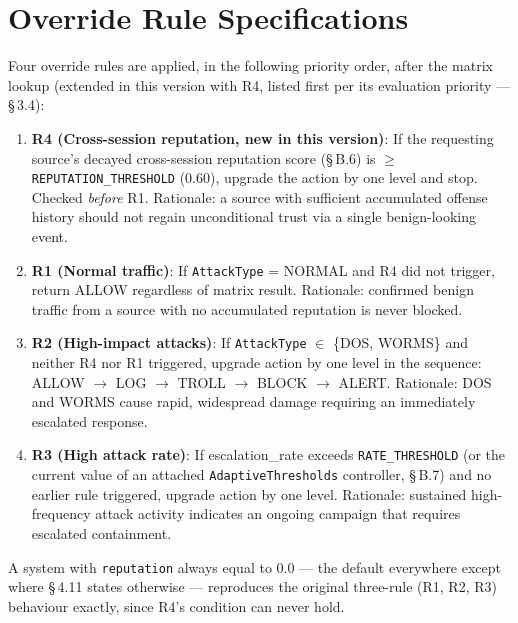 \section{Override Rule Specifications}

Four override rules are applied, in the following priority order, after the
matrix lookup (extended in this version with R4, listed first per its
evaluation priority --- \S\,3.4):

\begin{enumerate}
  \item \textbf{R4 (Cross-session reputation, new in this version)}: If the
        requesting source's decayed cross-session reputation score
        (\S\,B.6) is $\geq$ \texttt{REPUTATION\_THRESHOLD} (0.60), upgrade
        the action by one level and stop. Checked \emph{before} R1.
        Rationale: a source with sufficient accumulated offense history
        should not regain unconditional trust via a single benign-looking
        event.

  \item \textbf{R1 (Normal traffic)}: If \texttt{AttackType} = NORMAL and R4
        did not trigger, return ALLOW regardless of matrix result.
        Rationale: confirmed benign traffic from a source with no
        accumulated reputation is never blocked.

  \item \textbf{R2 (High-impact attacks)}: If \texttt{AttackType} $\in$
        \{DOS, WORMS\} and neither R4 nor R1 triggered, upgrade action by one
        level in the sequence:
        ALLOW $\to$ LOG $\to$ TROLL $\to$ BLOCK $\to$ ALERT.
        Rationale: DOS and WORMS cause rapid, widespread damage requiring
        an immediately escalated response.

  \item \textbf{R3 (High attack rate)}: If escalation\_rate exceeds
        \texttt{RATE\_THRESHOLD} (or the current value of an attached
        \texttt{AdaptiveThresholds} controller, \S\,B.7) and no earlier rule
        triggered, upgrade action by one level.
        Rationale: sustained high-frequency attack activity indicates an
        ongoing campaign that requires escalated containment.
\end{enumerate}

A system with \texttt{reputation} always equal to 0.0 --- the default
everywhere except where \S\,4.11 states otherwise --- reproduces the
original three-rule (R1, R2, R3) behaviour exactly, since R4's condition can
never hold.


